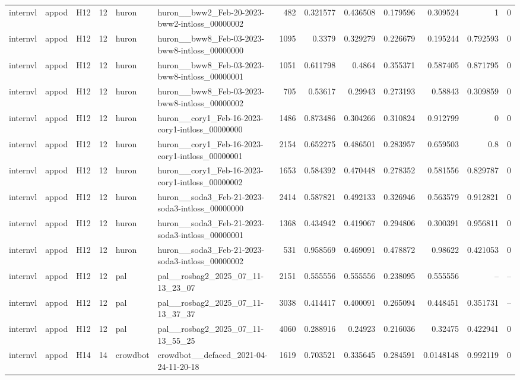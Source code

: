 \begin{longtable}{lllrllrrrrrrr}
internvl & appod & H12 & 12 & huron & huron\_\_bww2\_Feb-20-2023-bww2-intloss\_00000002 & 482 & 0.321577 & 0.436508 & 0.179596 & 0.309524 & 1 & 0 \\
internvl & appod & H12 & 12 & huron & huron\_\_bww8\_Feb-03-2023-bww8-intloss\_00000000 & 1095 & 0.3379 & 0.329279 & 0.226679 & 0.195244 & 0.792593 & 0 \\
internvl & appod & H12 & 12 & huron & huron\_\_bww8\_Feb-03-2023-bww8-intloss\_00000001 & 1051 & 0.611798 & 0.4864 & 0.355371 & 0.587405 & 0.871795 & 0 \\
internvl & appod & H12 & 12 & huron & huron\_\_bww8\_Feb-03-2023-bww8-intloss\_00000002 & 705 & 0.53617 & 0.29943 & 0.273193 & 0.58843 & 0.309859 & 0 \\
internvl & appod & H12 & 12 & huron & huron\_\_cory1\_Feb-16-2023-cory1-intloss\_00000000 & 1486 & 0.873486 & 0.304266 & 0.310824 & 0.912799 & 0 & 0 \\
internvl & appod & H12 & 12 & huron & huron\_\_cory1\_Feb-16-2023-cory1-intloss\_00000001 & 2154 & 0.652275 & 0.486501 & 0.283957 & 0.659503 & 0.8 & 0 \\
internvl & appod & H12 & 12 & huron & huron\_\_cory1\_Feb-16-2023-cory1-intloss\_00000002 & 1653 & 0.584392 & 0.470448 & 0.278352 & 0.581556 & 0.829787 & 0 \\
internvl & appod & H12 & 12 & huron & huron\_\_soda3\_Feb-21-2023-soda3-intloss\_00000000 & 2414 & 0.587821 & 0.492133 & 0.326946 & 0.563579 & 0.912821 & 0 \\
internvl & appod & H12 & 12 & huron & huron\_\_soda3\_Feb-21-2023-soda3-intloss\_00000001 & 1368 & 0.434942 & 0.419067 & 0.294806 & 0.300391 & 0.956811 & 0 \\
internvl & appod & H12 & 12 & huron & huron\_\_soda3\_Feb-21-2023-soda3-intloss\_00000002 & 531 & 0.958569 & 0.469091 & 0.478872 & 0.98622 & 0.421053 & 0 \\
internvl & appod & H12 & 12 & pal & pal\_\_rosbag2\_2025\_07\_11-13\_23\_07 & 2151 & 0.555556 & 0.555556 & 0.238095 & 0.555556 & -- & -- \\
internvl & appod & H12 & 12 & pal & pal\_\_rosbag2\_2025\_07\_11-13\_37\_37 & 3038 & 0.414417 & 0.400091 & 0.265094 & 0.448451 & 0.351731 & -- \\
internvl & appod & H12 & 12 & pal & pal\_\_rosbag2\_2025\_07\_11-13\_55\_25 & 4060 & 0.288916 & 0.24923 & 0.216036 & 0.32475 & 0.422941 & 0 \\
internvl & appod & H14 & 14 & crowdbot & crowdbot\_\_defaced\_2021-04-24-11-20-18 & 1619 & 0.703521 & 0.335645 & 0.284591 & 0.0148148 & 0.992119 & 0 \\

\end{longtable}

